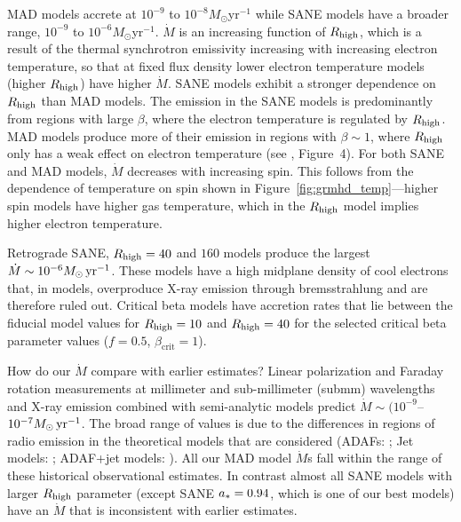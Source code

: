 MAD models accrete at $10^{-9}$ to $10^{-8} M_{\odot}$yr$^{-1}$ while SANE models have a broader range, $10^{-9}$ to $10^{-6} M_{\odot}$yr$^{-1}$.
$\dot{M}$ is an increasing function of $R_\mathrm{high}$, which is a result of the thermal synchrotron emissivity increasing with increasing electron temperature, so that at fixed flux density lower electron temperature models (higher $R_\mathrm{high}$) have higher $\dot{M}$.  
SANE models exhibit a stronger dependence on $R_\mathrm{high}$ than MAD models.
The emission in the SANE models is predominantly from regions with large $\beta$, where the electron temperature is regulated by $R_\mathrm{high}$.
MAD models produce more of their emission in regions with $\beta\sim 1$, where $R_\mathrm{high}$ only has a weak effect on electron temperature  (see , Figure~4).
For both SANE and MAD models, $\dot{M}$ decreases with increasing spin.
This follows from the dependence of temperature on spin shown in Figure~\ref{fig:grmhd_temp}---higher spin models have higher gas temperature, which in the $R_\mathrm{high}$ model implies higher electron temperature.

Retrograde SANE, $R_\mathrm{high}=40$ and $160$ models produce the largest $\dot{M} \sim 10^{-6}M_{\odot}\,\mathrm{yr}^{-1}$.
These models have a high midplane density of cool electrons that, in \kharma models, overproduce X-ray emission through bremsstrahlung and are therefore ruled out.
Critical beta models have accretion rates that lie between the fiducial model values for $R_\mathrm{high} = 10$ and $R_\mathrm{high} = 40$ for the selected critical beta parameter values ($f=0.5$, $\beta_\mathrm{crit}=1$).

How do our $\dot{M}$ compare with earlier estimates?
Linear polarization and Faraday rotation measurements at millimeter and sub-millimeter (submm) wavelengths \citep{2000ApJ...538L.121A, 2000ApJ...545..842Q, 2003ApJ...588..331B, 2006ApJ...640..308M, 2006JPhCS..54..354M, 2006ApJ...646L.111M} and X-ray emission \citep{2003ApJ...591..891B, doi:10.1126/science.1240755} combined  with semi-analytic models predict $\dot{M} \sim (10^{-9}$--$10^{-7} M_{\odot}\,\mathrm{yr}^{-1}$.
The broad range of values is due to the differences in regions of radio emission in the theoretical models that are considered (ADAFs: \citealt{1998ApJ...492..554N, Yuan_2003}; Jet models: \citealt{1993A&A...278L...1F, 2000A&A...362..113F}; ADAF+jet models: \citealt{2002A&A...383..854Y}).
All our MAD model $\dot{M}$s fall within the range of these historical observational estimates.
In contrast almost all SANE models with larger $R_\mathrm{high}$ parameter (except SANE $a_*=0.94$, which is one of our best models) have an $\dot{M}$ that is inconsistent with earlier estimates.

